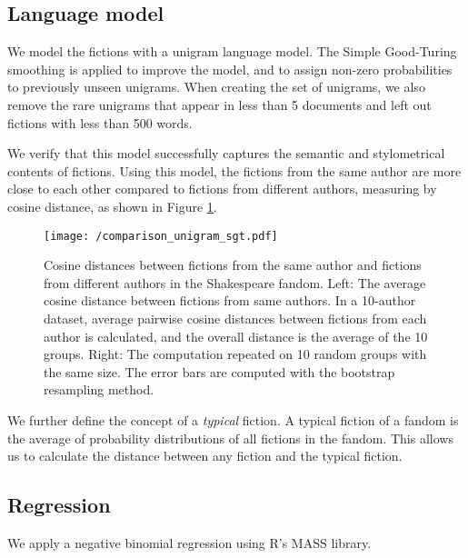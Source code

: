 \documentclass[11pt]{article} %
\begin{document}
\subsection{Language model}
We model the fictions with a unigram language model. The Simple Good-Turing smoothing\cite{gales1995good} is applied to improve the model, and to assign non-zero probabilities to previously unseen unigrams. When creating the set of unigrams, we also remove the rare unigrams that appear in less than 5 documents and left out fictions with less than 500 words.

We verify that this model successfully captures the semantic and stylometrical contents of fictions. Using this model, the fictions from the same author are more close to each other compared to fictions from different authors, measuring by cosine distance, as shown in Figure \ref{fig:comparison_unigram_sgt}.

\begin{figure}[htbp]
\begin{center}
\texttt{[image: /comparison\_unigram\_sgt.pdf]}
\caption{Cosine distances between fictions from the same author and fictions from different authors in the Shakespeare fandom.
Left: The average cosine distance between fictions from same authors. In a 10-author dataset, average pairwise cosine distances between fictions from each author is calculated, and the overall distance is the average of the 10 groups. Right: The computation repeated on 10 random groups with the same size. The error bars are computed with the bootstrap resampling method. }
\label{fig:comparison_unigram_sgt}
\end{center}
\end{figure}

We further define the concept of a \emph{typical} fiction. A typical fiction of a fandom is the average of probability distributions of all fictions in the fandom. This allows us to calculate the distance between any fiction and the typical fiction. 

\subsection{Regression}
We apply a negative binomial regression using R's MASS library. 










\printbibliography
    
\end{document}
